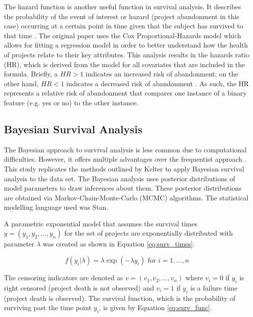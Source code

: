 \documentclass[sigconf]{acmart}
\begin{document}
The hazard function is another useful function in survival analysis. It describes the probability of the event of interest or hazard (project abandonment in this case) occurring at a certain point in time given that the subject has survived to that time \cite{clark2003go}.
The original paper uses the Cox Proportional-Hazards model which allows for fitting a regression model in order to better understand how the health of projects relate to their key attributes. 
This analysis results in the hazards ratio (HR), which is derived from the model for all covariates that are included in the formula. 
Briefly, a $HR > 1$ indicates an increased risk of abandonment; on the other hand, $HR < 1$ indicates a decreased risk of abandonment \cite{cox1972regression}. 
As such, the HR represents a relative risk of abandonment that compares one instance of a binary feature (e.g. yes or no) to the other instance.

\subsection{Bayesian Survival Analysis} \label{bayes_surv_analysis}

The Bayesian approach to survival analysis is less common due to computational difficulties. 
However, it offers multiple advantages over the frequentist approach \cite{kelter2020bayesian}. 
This study replicates the methods outlined by Kelter \cite{kelter2020bayesian} to apply Bayesian survival analysis to the data set.
The Bayesian analysis uses posterior distributions of model parameters to draw inferences about them. 
These posterior distributions are obtained via Markov-Chain-Monte-Carlo (MCMC) algorithms. 
The statistical modelling language used was Stan.

A parametric exponential model that assumes the survival times $y = (y_1, y_2, \dots, y_n)$ for the set of projects are exponentially distributed with parameter $\lambda$ was created as shown in Equation \ref{eq:surv_times}.

\begin{equation} \label{eq:surv_times}
    f(y_i|\lambda) = \lambda\exp(- \lambda y_i) \mbox{ for } i=1,\dots,n
\end{equation}

The censoring indicators are denoted as $v = (v_1, v_2,\dots, v_n)$ where $v_i = 0$ if $y_i$ is right censored (project death is not observed) and $v_i = 1$ if $y_i$ is a failure time (project death is observed). The survival function, which is the probability of surviving past the time point $y_i$, is given by Equation \ref{eq:surv_func}.
\end{document}
